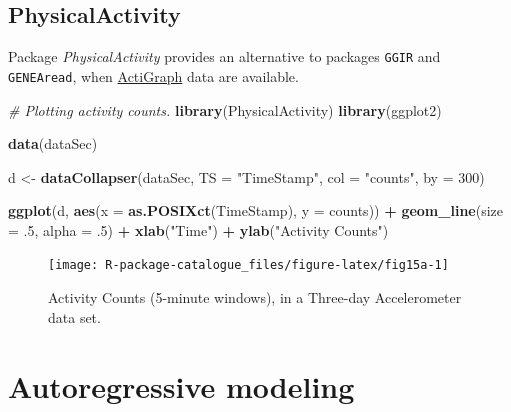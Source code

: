 \documentclass[]{book}
\newenvironment{Shaded}{\begin{snugshade}}{\end{snugshade}}
\newcommand{\KeywordTok}[1]{\textcolor[rgb]{0.13,0.29,0.53}{\textbf{#1}}}
\newcommand{\DataTypeTok}[1]{\textcolor[rgb]{0.13,0.29,0.53}{#1}}
\newcommand{\DecValTok}[1]{\textcolor[rgb]{0.00,0.00,0.81}{#1}}
\newcommand{\StringTok}[1]{\textcolor[rgb]{0.31,0.60,0.02}{#1}}
\newcommand{\CommentTok}[1]{\textcolor[rgb]{0.56,0.35,0.01}{\textit{#1}}}
\newcommand{\OperatorTok}[1]{\textcolor[rgb]{0.81,0.36,0.00}{\textbf{#1}}}
\newcommand{\NormalTok}[1]{#1}
\begin{document}
\subsection{PhysicalActivity}\label{physicalactivity}


Package \emph{PhysicalActivity} \citep{R-PhysicalActivity} provides an
alternative to packages \texttt{GGIR} and \texttt{GENEAread}, when
\href{https://actigraphcorp.com/}{ActiGraph} data are available.

\begin{Shaded}
\begin{Highlighting}[]
\CommentTok{# Plotting activity counts.}
\KeywordTok{library}\NormalTok{(PhysicalActivity)}
\KeywordTok{library}\NormalTok{(ggplot2)}

\KeywordTok{data}\NormalTok{(dataSec)}

\NormalTok{d <-}\StringTok{ }\KeywordTok{dataCollapser}\NormalTok{(dataSec, }\DataTypeTok{TS =} \StringTok{"TimeStamp"}\NormalTok{, }\DataTypeTok{col =} \StringTok{"counts"}\NormalTok{, }\DataTypeTok{by =} \DecValTok{300}\NormalTok{)}

\KeywordTok{ggplot}\NormalTok{(d, }\KeywordTok{aes}\NormalTok{(}\DataTypeTok{x =} \KeywordTok{as.POSIXct}\NormalTok{(TimeStamp), }\DataTypeTok{y =}\NormalTok{ counts)) }\OperatorTok{+}
\StringTok{  }\KeywordTok{geom_line}\NormalTok{(}\DataTypeTok{size =}\NormalTok{ .}\DecValTok{5}\NormalTok{, }\DataTypeTok{alpha =}\NormalTok{ .}\DecValTok{5}\NormalTok{) }\OperatorTok{+}
\StringTok{  }\KeywordTok{xlab}\NormalTok{(}\StringTok{"Time"}\NormalTok{) }\OperatorTok{+}\StringTok{ }\KeywordTok{ylab}\NormalTok{(}\StringTok{"Activity Counts"}\NormalTok{)}
\end{Highlighting}
\end{Shaded}

\begin{figure}

{\centering \texttt{[image: R-package-catalogue\_files/figure-latex/fig15a-1]} 

}

\caption{Activity Counts (5-minute windows), in a Three-day Accelerometer data set.}\label{fig:fig15a}
\end{figure}

\section{Autoregressive modeling}\label{autoregressive-modeling}
\end{document}
